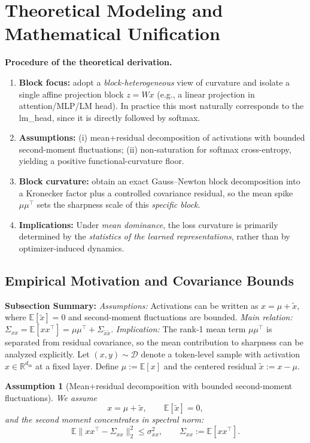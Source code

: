 \documentclass[11pt]{article}
\newtheorem{assumption}{Assumption}
\begin{document}
\section{Theoretical Modeling and Mathematical Unification}

\textbf{Procedure of the theoretical derivation.}
\begin{enumerate}
  \item \textbf{Block focus:} adopt a \emph{block-heterogeneous} view of curvature and isolate a single affine projection block $z=Wx$ (e.g., a linear projection in attention/MLP/LM head).
In practice this most naturally corresponds to the lm\_head, since it is directly followed by softmax.
  \item \textbf{Assumptions:} (i) mean+residual decomposition of activations with bounded second-moment fluctuations;
(ii) non-saturation for softmax cross-entropy, yielding a positive functional-curvature floor.
  \item \textbf{Block curvature:} obtain an exact Gauss--Newton block decomposition into a Kronecker factor plus a controlled covariance residual, so the mean spike $\mu\mu^\top$ sets the sharpness scale of this \emph{specific block}.
  \item \textbf{Implications:} Under \emph{mean dominance}, the loss curvature is primarily determined by the \emph{statistics of the learned representations}, rather than by optimizer-induced dynamics.
\end{enumerate}


\subsection{Empirical Motivation and Covariance Bounds}

\textbf{Subsection Summary:}
\textit{Assumptions:} Activations can be written as $x=\mu+\tilde x$, where $\mathbb{E}[\tilde x]=0$ and second-moment fluctuations are bounded.
\textit{Main relation:} $\Sigma_{xx}=\mathbb{E}[xx^\top]=\mu\mu^\top+\Sigma_{\tilde x\tilde x}$.
\textit{Implication:} The rank-1 mean term $\mu\mu^\top$ is separated from residual covariance, so the mean contribution to sharpness can be analyzed explicitly.
Let $(x,y)\sim\mathcal{D}$ denote a token-level sample with activation $x\in\mathbb{R}^{d_{\mathrm{in}}}$ at a fixed layer.
Define $\mu := \mathbb{E}[x]$ and the centered residual $\tilde x := x-\mu$.
\begin{assumption}[Mean+residual decomposition with bounded second-moment fluctuations]
\label{assum:decomposition}
We assume
\[
x=\mu+\tilde x,\qquad \mathbb{E}[\tilde x]=0,
\]
and the second moment concentrates in spectral norm:
\[
\mathbb{E}\bigl\|xx^\top-\Sigma_{xx}\bigr\|_2^2 \le \sigma_{xx}^2,\qquad \Sigma_{xx}:=\mathbb{E}[xx^\top].
\]
\end{assumption}
\end{document}
